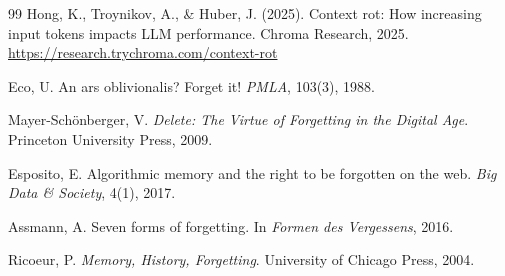 \documentclass[12pt]{article}
\begin{document}
\begin{thebibliography}{99}
Hong, K., Troynikov, A., \& Huber, J. (2025).
\newblock Context rot: How increasing input tokens impacts {LLM} performance.
\newblock Chroma Research, 2025.
\newblock \url{https://research.trychroma.com/context-rot}


Eco, U.
\newblock An ars oblivionalis? Forget it!
\newblock \emph{PMLA}, 103(3), 1988.

Mayer-Sch\"{o}nberger, V.
\newblock \emph{Delete: The Virtue of Forgetting in the Digital Age}.
\newblock Princeton University Press, 2009.

Esposito, E.
\newblock Algorithmic memory and the right to be forgotten on the web.
\newblock \emph{Big Data \& Society}, 4(1), 2017.

Assmann, A.
\newblock Seven forms of forgetting.
\newblock In \emph{Formen des Vergessens}, 2016.

Ricoeur, P.
\newblock \emph{Memory, History, Forgetting}.
\newblock University of Chicago Press, 2004.

\end{thebibliography}
\end{document}
